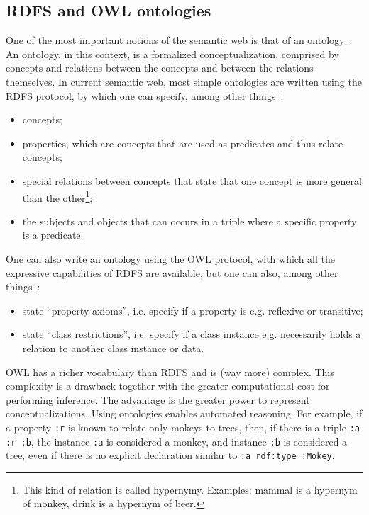 \documentclass[data,datadescriptor,submit,moreauthors,pdftex]{Definitions/mdpi}
\newcommand{\textttt}[1] {\texttt{\footnotesize#1}}
\begin{document}
\subsection{RDFS and OWL ontologies}\label{sont}
One of the most important notions of the semantic web is that of an ontology~\cite{ont}.
An ontology, in this context, is a formalized conceptualization, comprised by
concepts and relations between the concepts and between the relations themselves.
In current semantic web, most simple ontologies are written using the RDFS protocol,
by which one can specify, among other things~\cite{rdfs}:
\begin{itemize}
  \item concepts;
  \item properties, which are concepts that are used as predicates and thus relate concepts;
  \item special relations between concepts that state that one concept is more general than the other\footnote{This
          kind of relation is called hypernymy. Examples: mammal is a hypernym of monkey, drink is a hypernym of beer.};
  \item the subjects and objects that can occurs in a triple where a specific property is a predicate.
\end{itemize}

One can also write an ontology using the OWL protocol,
with which all the expressive capabilities of RDFS are
available, but one can also, among other things~\cite{ont}:
\begin{itemize}
  \item state ``property axioms'', i.e. specify if a property is e.g. reflexive or transitive;
  \item state ``class restrictions'', i.e. specify if a class instance e.g. necessarily holds a relation to another class instance or data.
\end{itemize}
OWL has a richer vocabulary than RDFS and is (way more) complex.
This complexity is a drawback together with the greater computational cost
for performing inference.
The advantage is the greater power to represent conceptualizations.
Using ontologies enables automated reasoning.
For example, if a property \textttt{:r} is known to relate only mokeys to trees,
then, if there is a triple \textttt{:a :r :b}, the instance \textttt{:a} is considered a monkey,
and instance \textttt{:b} is considered a tree,
even if there is no explicit declaration similar
to \textttt{:a rdf:type :Mokey}.
\end{document}
